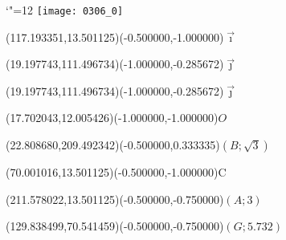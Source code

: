 \documentclass[12pt]{article}
\begin{document}
\makeatletter%
\let\ASYencoding\f@encoding%
\let\ASYfamily\f@family%
\let\ASYseries\f@series%
\let\ASYshape\f@shape%
\makeatother%
{\catcode`"=12%
\texttt{[image: 0306\_0]}%
}%
\kern -227.622047pt%
%
%
\fontsize{12.000000}{14.400000}\selectfont%
\usefont{\ASYencoding}{\ASYfamily}{\ASYseries}{\ASYshape}%
\ASYalign(117.193351,13.501125)(-0.500000,-1.000000){$\vec{\imath}$}%
%
%
\fontsize{12.000000}{14.400000}\selectfont%
\ASYalign(19.197743,111.496734)(-1.000000,-0.285672){$\vec{\jmath}$}%
%
%
\fontsize{12.000000}{14.400000}\selectfont%
\ASYalign(19.197743,111.496734)(-1.000000,-0.285672){$\vec{\jmath}$}%
%
%
\fontsize{12.000000}{14.400000}\selectfont%
\ASYalign(17.702043,12.005426)(-1.000000,-1.000000){$O$}%
%
%
\fontsize{12.000000}{14.400000}\selectfont%
\ASYalign(22.808680,209.492342)(-0.500000,0.333335){$\left(B;\sqrt{3}\right)$}%
%
%
\fontsize{12.000000}{14.400000}\selectfont%
\ASYalign(70.001016,13.501125)(-0.500000,-1.000000){C}%
%
%
\fontsize{12.000000}{14.400000}\selectfont%
\ASYalign(211.578022,13.501125)(-0.500000,-0.750000){$\left(A;3\right)$}%
%
%
\fontsize{12.000000}{14.400000}\selectfont%
\ASYalign(129.838499,70.541459)(-0.500000,-0.750000){$\left(G;5.732\right)$}%
\end{document}

